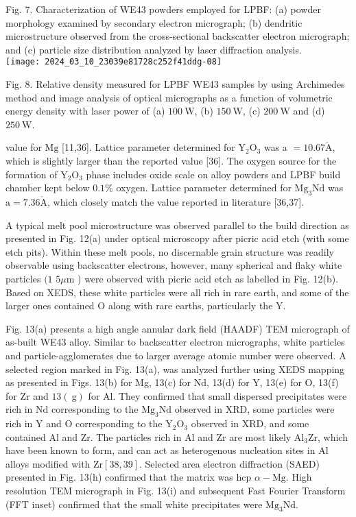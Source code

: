\documentclass[10pt]{article}
\def\AA{\mathring{\mathrm{A}}}
\begin{document}
Fig. 7. Characterization of WE43 powders employed for LPBF: (a) powder morphology examined by secondary electron micrograph; (b) dendritic microstructure observed from the cross-sectional backscatter electron micrograph; and (c) particle size distribution analyzed by laser diffraction analysis.\\
\texttt{[image: 2024\_03\_10\_23039e81728c252f41ddg-08]}

Fig. 8. Relative density measured for LPBF WE43 samples by using Archimedes method and image analysis of optical micrographs as a function of volumetric energy density with laser power of (a) $100 \mathrm{~W}$, (b) $150 \mathrm{~W}$, (c) $200 \mathrm{~W}$ and (d) $250 \mathrm{~W}$.

value for $\mathrm{Mg}$ [11,36]. Lattice parameter determined for $\mathrm{Y}_{2} \mathrm{O}_{3}$ was a $=10.67 \AA$, which is slightly larger than the reported value [36]. The oxygen source for the formation of $\mathrm{Y}_{2} \mathrm{O}_{3}$ phase includes oxide scale on alloy powders and LPBF build chamber kept below $0.1 \%$ oxygen. Lattice parameter determined for $\mathrm{Mg}_{3} \mathrm{Nd}$ was $\mathrm{a}=7.36 \AA$, which closely match the value reported in literature [36,37].

A typical melt pool microstructure was observed parallel to the build direction as presented in Fig. 12(a) under optical microscopy after picric acid etch (with some etch pits). Within these melt pools, no discernable grain structure was readily observable using backscatter electrons, however, many spherical and flaky white particles $(1$ $5 \mu \mathrm{m}$ ) were observed with picric acid etch as labelled in Fig. 12(b). Based on XEDS, these white particles were all rich in rare earth, and some of the larger ones contained $\mathrm{O}$ along with rare earths, particularly the $\mathrm{Y}$.

Fig. 13(a) presents a high angle annular dark field (HAADF) TEM micrograph of as-built WE43 alloy. Similar to backscatter electron micrographs, white particles and particle-agglomerates due to larger average atomic number were observed. A selected region marked in Fig. 13(a), was analyzed further using XEDS mapping as presented in Figs. 13(b) for Mg, 13(c) for Nd, 13(d) for Y, 13(e) for O, 13(f) for Zr and $13(\mathrm{~g})$ for Al. They confirmed that small dispersed precipitates were rich in $\mathrm{Nd}$ corresponding to the $\mathrm{Mg}_{3} \mathrm{Nd}$ observed in XRD, some particles were rich in $\mathrm{Y}$ and $\mathrm{O}$ corresponding to the $\mathrm{Y}_{2} \mathrm{O}_{3}$ observed in XRD, and some contained $\mathrm{Al}$ and $\mathrm{Zr}$. The particles rich in $\mathrm{Al}$ and $\mathrm{Zr}$ are most likely $\mathrm{Al}_{3} \mathrm{Zr}$, which have been known to form, and can act as heterogenous nucleation sites in Al alloys modified with $\mathrm{Zr}[38,39]$. Selected area electron diffraction (SAED) presented in Fig. 13(h) confirmed that the matrix was hcp $\alpha-\mathrm{Mg}$. High resolution TEM micrograph in Fig. 13(i) and subsequent Fast Fourier Transform (FFT inset) confirmed that the small white precipitates were $\mathrm{Mg}_{3} \mathrm{Nd}$.
\end{document}
